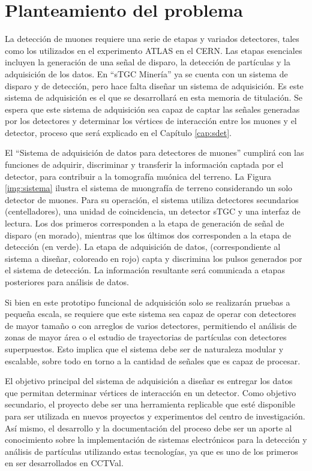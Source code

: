 \section{Planteamiento del problema}
\label{sec:planteamiento}
	La detección de muones requiere una serie de etapas y variados detectores,  tales como los utilizados en el experimento ATLAS en el CERN. Las etapas esenciales incluyen la generación de una señal de disparo\cite{Oyanadel2020SistemaSTGC}, la detección de partículas y la adquisición de los datos. En ``sTGC Minería'' ya se cuenta con un sistema de disparo y de detección, pero hace falta diseñar un sistema de adquisición. Es este sistema de adquisición es el que se desarrollará en esta memoria de titulación. Se espera que este sistema de adquisición sea capaz de captar las señales generadas por los detectores y determinar los vértices de interacción entre los muones y el detector, proceso que será explicado en el Capítulo \ref{cap:sdet}. 
	
	El ``Sistema de adquisición de datos para detectores de muones'' cumplirá con las funciones de adquirir, discriminar y transferir la información captada por el detector, para contribuir a la tomografía muónica del terreno. La Figura \ref{img:sistema} ilustra el sistema de muongrafía de terreno considerando un solo detector de muones. Para su operación, el sistema utiliza detectores secundarios (centelladores), una unidad de coincidencia, un detector sTGC y una interfaz de lectura. Los dos primeros corresponden a la etapa de generación de señal de disparo (en morado), mientras que los últimos dos corresponden a la etapa de detección (en verde). La etapa de adquisición de datos, (correspondiente al sistema  a diseñar, coloreado en rojo) capta y discrimina los pulsos generados por el sistema de detección. La información resultante será comunicada a etapas posteriores para análisis de datos.
	
	Si bien en este prototipo funcional de adquisición solo se realizarán pruebas a pequeña escala, se requiere que este sistema sea capaz de operar con detectores de mayor tamaño o con arreglos de varios detectores, permitiendo el análisis de zonas de mayor área o el estudio de trayectorias de partículas con detectores superpuestos. Esto implica que el sistema debe ser de naturaleza modular y escalable, sobre todo en torno a la cantidad de señales que es capaz de procesar. 
	
	El objetivo principal del sistema de adquisición a diseñar es entregar los datos que permitan determinar vértices de interacción en un detector. Como objetivo secundario, el proyecto debe ser una herramienta replicable que esté disponible para ser utilizada en nuevos proyectos y experimentos del centro de investigación. Así mismo, el desarrollo y la documentación del proceso debe ser un aporte al conocimiento sobre la implementación de sistemas electrónicos para la detección y análisis de partículas utilizando estas tecnologías, ya que es uno de los primeros en ser desarrollados en CCTVal. 
	
